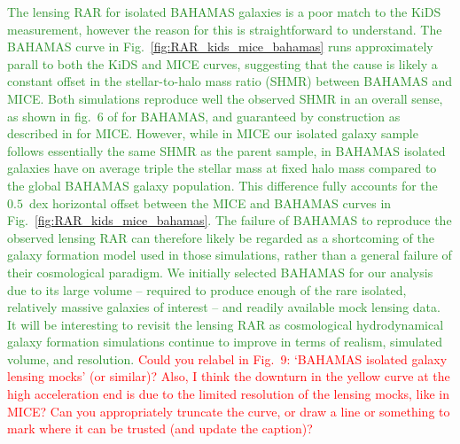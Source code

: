 \documentclass[usenatbib]{mnras}
\begin{document}
\textcolor{ForestGreen}{The lensing RAR for isolated BAHAMAS galaxies is a poor match to the KiDS measurement, however the reason for this is straightforward to understand. The BAHAMAS curve in Fig.~\ref{fig:RAR_kids_mice_bahamas} runs approximately parall to both the KiDS and MICE curves, suggesting that the cause is likely a constant offset in the stellar-to-halo mass ratio (SHMR) between BAHAMAS and MICE. Both simulations reproduce well the observed SHMR in an overall sense, as shown in fig.~6 of \citet{mccarthy2017} for BAHAMAS, and guaranteed by construction as described in \citet{carretero2015} for MICE. However, while in MICE our isolated galaxy sample follows essentially the same SHMR as the parent sample, in BAHAMAS isolated galaxies have on average triple the stellar mass at fixed halo mass compared to the global BAHAMAS galaxy population. This difference fully accounts for the $0.5$~dex horizontal offset between the MICE and BAHAMAS curves in Fig.~\ref{fig:RAR_kids_mice_bahamas}. The failure of BAHAMAS to reproduce the observed lensing RAR can therefore likely be regarded as a shortcoming of the galaxy formation model used in those simulations, rather than a general failure of their cosmological paradigm. We initially selected BAHAMAS for our analysis due to its large volume -- required to produce enough of the rare isolated, relatively massive galaxies of interest -- and readily available mock lensing data. It will be interesting to revisit the lensing RAR as cosmological hydrodynamical galaxy formation simulations continue to improve in terms of realism, simulated volume, and resolution.} \textcolor{red}{Could you relabel in Fig.~9: `BAHAMAS isolated galaxy lensing mocks' (or similar)? Also, I think the downturn in the yellow curve at the high acceleration end is due to the limited resolution of the lensing mocks, like in MICE? Can you appropriately truncate the curve, or draw a line or something to mark where it can be trusted (and update the caption)?}
\end{document}
